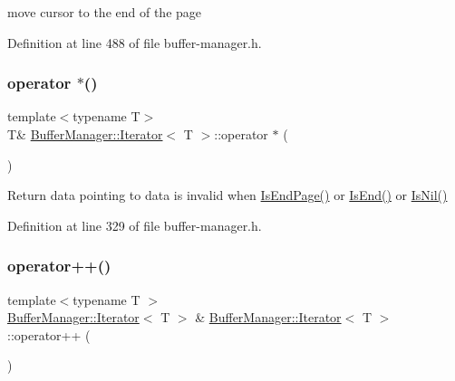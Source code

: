 move cursor to the end of the page 

Definition at line 488 of file buffer-\/manager.\+h.

\mbox{\label{class_buffer_manager_1_1_iterator_a633c54abf71a334ff179cc359e655d5d}} 
\subsubsection{\texorpdfstring{operator $\ast$()}{operator *()}}
{\footnotesize\ttfamily template$<$typename T$>$ \\
T\& \mbox{\hyperlink{class_buffer_manager_1_1_iterator}{Buffer\+Manager\+::\+Iterator}}$<$ T $>$\+::operator $\ast$ (\begin{DoxyParamCaption}{ }\end{DoxyParamCaption})\hspace{0.3cm}{\ttfamily [inline]}}

Return data pointing to data is invalid when {\ttfamily \mbox{\hyperlink{class_buffer_manager_1_1_iterator_a6afaceac9683f05d9e1ecfc9ff5f3a0f}{Is\+End\+Page()}}} or {\ttfamily \mbox{\hyperlink{class_buffer_manager_1_1_iterator_a02a38a84fd54e45d06818d2807b172d8}{Is\+End()}}} or {\ttfamily \mbox{\hyperlink{class_buffer_manager_1_1_iterator_ad19030c51bf30e6d6e9e2e560cc511c4}{Is\+Nil()}}} 

Definition at line 329 of file buffer-\/manager.\+h.

\mbox{\label{class_buffer_manager_1_1_iterator_aabf5af4d55b46c14bddff0e7caab3665}} 
\subsubsection{\texorpdfstring{operator++()}{operator++()}}
{\footnotesize\ttfamily template$<$typename T $>$ \\
\mbox{\hyperlink{class_buffer_manager_1_1_iterator}{Buffer\+Manager\+::\+Iterator}}$<$ T $>$ \& \mbox{\hyperlink{class_buffer_manager_1_1_iterator}{Buffer\+Manager\+::\+Iterator}}$<$ T $>$\+::operator++ (\begin{DoxyParamCaption}{ }\end{DoxyParamCaption})\hspace{0.3cm}{\ttfamily [inline]}}

